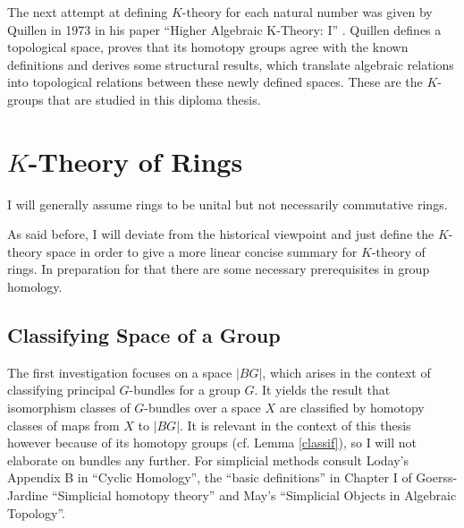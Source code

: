 The next attempt at defining $K$-theory for each natural number was given by Quillen in 1973 in his paper ``Higher Algebraic K-Theory: I'' \cite{quillen1973higher}.
Quillen defines a topological space, proves that its homotopy groups agree with the known definitions and derives some structural results, which translate algebraic relations
into topological relations between these newly defined spaces. These are the $K$-groups that are studied in this diploma thesis.

\section{$K$-Theory of Rings}
I will generally assume rings to be unital but not necessarily commutative rings.

As said before, I will deviate from the historical viewpoint and just define the $K$-theory space in order to give a more linear
concise summary for $K$-theory of rings. In preparation for that there are some necessary prerequisites in group homology.

\subsection{Classifying Space of a Group}
The first investigation focuses on a space $|BG|$, which arises in the context of classifying
principal $G$-bundles for a group $G$. It yields the result that isomorphism classes of $G$-bundles over a space $X$
are classified by homotopy classes of maps from $X$ to $|BG|$. It is relevant in the context of this thesis however
because of its homotopy groups (cf. Lemma \ref{classif}), so I will not elaborate on bundles any further.
For simplicial methods consult Loday's Appendix B in ``Cyclic Homology''\cite{LCy}, the ``basic
definitions'' in Chapter I of Goerss-Jardine ``Simplicial homotopy theory'' \cite{goerss2009simplicial}
and May's ``Simplicial Objects in Algebraic Topology''\cite{may1992simplicial}.

